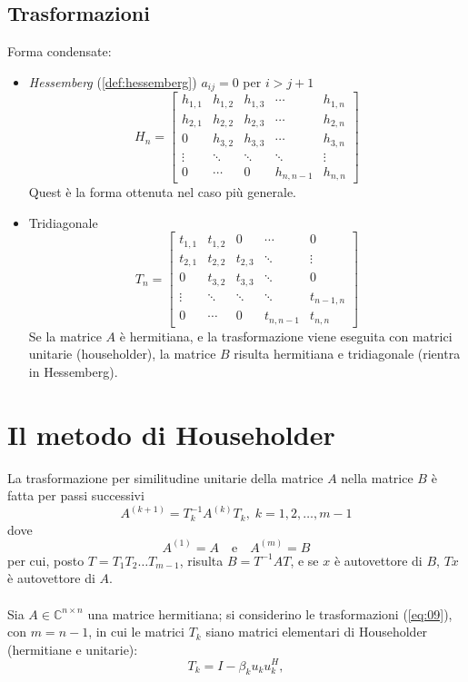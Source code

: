\subsection{Trasformazioni}
Forma condensate:
\begin{itemize}
\item \emph{Hessemberg} (\ref{def:hessemberg})
  $ a_{ij} = 0$ per $i > j+1$
  $$
  H_n = \begin{bmatrix}
    h_{1,1} & h_{1,2} & h_{1,3} & \cdots    & h_{1,n} \\
    h_{2,1} & h_{2,2} & h_{2,3} & \cdots    & h_{2,n} \\
    0       & h_{3,2} & h_{3,3} & \cdots    & h_{3,n} \\
    \vdots  & \ddots  & \ddots  & \ddots    & \vdots  \\
    0       & \cdots  & 0       & h_{n,n-1} & h_{n,n}
  \end{bmatrix}
  $$
Quest è la forma ottenuta nel caso più generale.

\item Tridiagonale
  $$
  T_n = \begin{bmatrix}
    t_{1,1} & t_{1,2} & 0 & \cdots  & 0 \\
    t_{2,1} & t_{2,2} & t_{2,3} & \ddots  & \vdots  \\
    0       & t_{3,2} & t_{3,3} & \ddots  & 0 \\
    \vdots  & \ddots  & \ddots  & \ddots  & t_{n-1,n}  \\
    0       & \cdots  & 0     & t_{n,n-1} & t_{n,n}
  \end{bmatrix}
  $$
Se la matrice $A$ è hermitiana, e la trasformazione viene eseguita con
matrici unitarie (householder), la matrice $B$ risulta hermitiana e
tridiagonale (rientra in Hessemberg).
\end{itemize}

\section{Il metodo di Householder}
La trasformazione per similitudine unitarie della matrice $A$ nella matrice $B$
\`e fatta per passi successivi
\begin{equation}
  \label{eq:09}
  A^{(k+1)} = T^{-1}_k A^{(k)} T_k,\;  k = 1, 2, \ldots , m-1
\end{equation}
dove
$$ A^{(1)}=A \quad \text{e} \quad A^{(m)}=B$$
per cui, posto $T = T_1 T_2 \ldots T_{m-1}$, risulta $B = T^{-1} AT$,
e se $x$ \`e autovettore  di $B$, $T x$ \`e autovettore di $A$.
\\ \\
Sia $A \in \mathbb{C}^{n \times n}$ una matrice hermitiana;
si considerino le trasformazioni (\ref{eq:09}), con $m = n-1$,
in cui le matrici $T_k$ siano matrici elementari di Householder
(hermitiane e unitarie):
$$T_k= I − \beta_k u_k u_k^{H} ,$$

